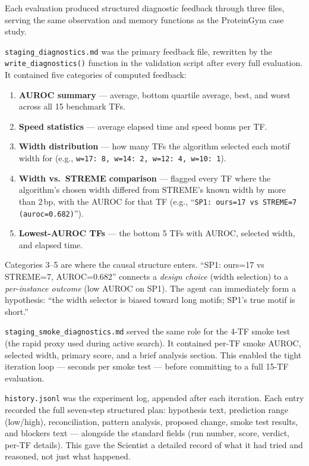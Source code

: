 \documentclass[11pt,a4paper]{article}
\begin{document}
Each evaluation produced structured diagnostic feedback through three files, serving the same observation and memory functions as the ProteinGym case study.

\texttt{staging\_diagnostics.md} was the primary feedback file, rewritten by the \texttt{write\_diagnostics()} function in the validation script after every full evaluation. It contained five categories of computed feedback:

\begin{enumerate}
    \item \textbf{AUROC summary} --- average, bottom quartile average, best, and worst across all 15 benchmark TFs.
    \item \textbf{Speed statistics} --- average elapsed time and speed bonus per TF.
    \item \textbf{Width distribution} --- how many TFs the algorithm selected each motif width for (e.g., \texttt{w=17: 8, w=14: 2, w=12: 4, w=10: 1}).
    \item \textbf{Width vs.\ STREME comparison} --- flagged every TF where the algorithm's chosen width differed from STREME's known width by more than 2\,bp, with the AUROC for that TF (e.g., ``\texttt{SP1: ours=17 vs STREME=7 (auroc=0.682)}'').
    \item \textbf{Lowest-AUROC TFs} --- the bottom 5 TFs with AUROC, selected width, and elapsed time.
\end{enumerate}

Categories 3--5 are where the causal structure enters. ``SP1: ours=17 vs STREME=7, AUROC=0.682'' connects a \emph{design choice} (width selection) to a \emph{per-instance outcome} (low AUROC on SP1). The agent can immediately form a hypothesis: ``the width selector is biased toward long motifs; SP1's true motif is short.''

\texttt{staging\_smoke\_diagnostics.md} served the same role for the 4-TF smoke test (the rapid proxy used during active search). It contained per-TF smoke AUROC, selected width, primary score, and a brief analysis section. This enabled the tight iteration loop --- seconds per smoke test --- before committing to a full 15-TF evaluation.

\texttt{history.jsonl} was the experiment log, appended after each iteration. Each entry recorded the full seven-step structured plan: hypothesis text, prediction range (low/high), reconciliation, pattern analysis, proposed change, smoke test results, and blockers text --- alongside the standard fields (run number, score, verdict, per-TF details). This gave the Scientist a detailed record of what it had tried and reasoned, not just what happened.
\end{document}
